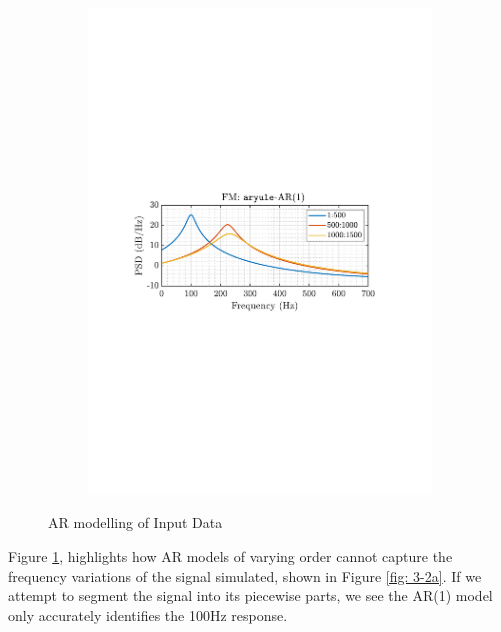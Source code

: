 \documentclass[12pt]{article}
\numberwithin{equation}{section}
\begin{document}
\begin{figure}[H]
\begin{subfigure}{0.49\textwidth}
					\includegraphics[trim={2.2cm 11.2cm 3.00cm  11.2cm}, clip, width=\textwidth]{../MATLAB/figures/q3_2a_fig04.pdf} 
					\captionsetup{justification=centering}
				\end{subfigure}
				
				\captionsetup{justification=centering}
				\caption{AR modelling of Input Data}
				\label{fig: 3-2a-AR-models}
			\end{figure}
			Figure \ref{fig: 3-2a-AR-models}, highlights how AR models of varying order cannot capture the frequency variations of the signal simulated, shown in Figure \ref{fig: 3-2a}. If we attempt to segment the signal into its piecewise parts, we see the AR(1) model only accurately identifies the 100Hz response.
			
\end{document}
